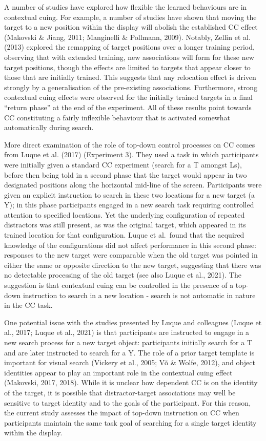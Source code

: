 \documentclass[
  man,floatsintext]{apa7}
\begin{document}
A number of studies have explored how flexible the learned behaviours are in contextual cuing. For example, a number of studies have shown that moving the target to a new position within the display will abolish the established CC effect (Makovski \& Jiang, 2011; Manginelli \& Pollmann, 2009). Notably, Zellin et al. (2013) explored the remapping of target positions over a longer training period, observing that with extended training, new associations will form for these new target positions, though the effects are limited to targets that appear closer to those that are initially trained. This suggests that any relocation effect is driven strongly by a generalisation of the pre-existing associations. Furthermore, strong contextual cuing effects were observed for the initially trained targets in a final ``return phase'' at the end of the experiment. All of these results point towards CC constituting a fairly inflexible behaviour that is activated somewhat automatically during search.

More direct examination of the role of top-down control processes on CC comes from Luque et al. (2017) (Experiment 3). They used a task in which participants were initially given a standard CC experiment (search for a T amongst Ls), before then being told in a second phase that the target would appear in two designated positions along the horizontal mid-line of the screen. Participants were given an explicit instruction to search in these two locations for a new target (a Y); in this phase participants engaged in a new search task requiring controlled attention to specified locations. Yet the underlying configuration of repeated distractors was still present, as was the original target, which appeared in its trained location for that configuration. Luque et al.~found that the acquired knowledge of the configurations did not affect performance in this second phase: responses to the new target were comparable when the old target was pointed in either the same or opposite direction to the new target, suggesting that there was no detectable processing of the old target (see also Luque et al., 2021). The suggestion is that contextual cuing can be controlled in the presence of a top-down instruction to search in a new location - search is not automatic in nature in the CC task.

One potential issue with the studies presented by Luque and colleagues (Luque et al., 2017; Luque et al., 2021) is that participants are instructed to engage in a new search process for a new target object: participants initially search for a T and are later instructed to search for a Y. The role of a prior target template is important for visual search (Vickery et al., 2005; Võ \& Wolfe, 2012), and object identities appear to play an important role in the contextual cuing effect (Makovski, 2017, 2018). While it is unclear how dependent CC is on the identity of the target, it is possible that distractor-target associations may well be sensitive to target identity and to the goals of the participant. For this reason, the current study assesses the impact of top-down instruction on CC when participants maintain the same task goal of searching for a single target identity within the display.
\end{document}
